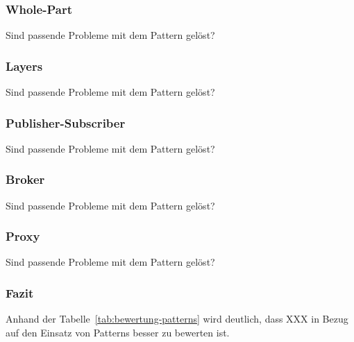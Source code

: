 \subsubsection{Whole-Part}
\color{red}
Sind passende Probleme mit dem Pattern gelöst?
\color{black}

\subsubsection{Layers}
\color{red}
Sind passende Probleme mit dem Pattern gelöst?
\color{black}

\subsubsection{Publisher-Subscriber}
\color{red}
Sind passende Probleme mit dem Pattern gelöst?
\cite{filament-docs-events}
\cite{nova-docs-events}
\color{black}

\subsubsection{Broker}
\color{red}
Sind passende Probleme mit dem Pattern gelöst?
\color{black}

\subsubsection{Proxy}
\color{red}
Sind passende Probleme mit dem Pattern gelöst?
\color{black}

\subsubsection{Fazit}

\color{red}
Anhand der Tabelle~\ref{tab:bewertung-patterns} wird deutlich, dass XXX in Bezug auf den Einsatz von Patterns besser zu bewerten ist.

